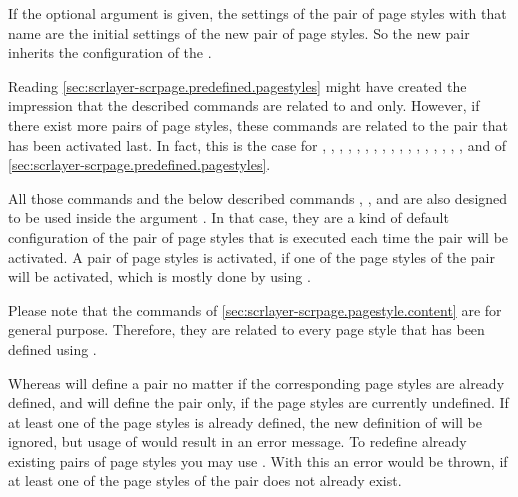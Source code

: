 If the optional argument  is given, the settings of the
pair of page styles with that name are the initial settings of the new pair of
page styles. So the new pair inherits the configuration of the .

Reading \autoref{sec:scrlayer-scrpage.predefined.pagestyles} might have
created the impression that the described commands are related to
 and  only. However, if
there exist more pairs of page styles, these commands are related to the pair
that has been activated last. In fact, this is the case for ,
, , , ,
, , , ,
, , , , ,
, , , and  of
\autoref{sec:scrlayer-scrpage.predefined.pagestyles}.

All those commands and the below described commands
, , and
 are also designed to be used inside the argument
. In that case, they are a kind of default configuration of
the pair of page styles that is executed each time the pair will be
activated. A pair of page styles is activated, if one of the page styles of
the pair will be activated, which is mostly done by using
.

Please note that the commands of
\autoref{sec:scrlayer-scrpage.pagestyle.content} are for general
purpose. Therefore, they are related to every page style that has been defined
using .

Whereas  will define a pair no matter if the
corresponding page styles are already defined,  and
 will define the pair only, if the page styles
are currently undefined. If at least one of the page styles is already
defined, the new definition of  will be
ignored, but usage of  would result in an error
message. To redefine already existing pairs of page styles you may use
. With this an error would be thrown, if at least
one of the page styles of the pair does not already exist.%
%
%
%
%

